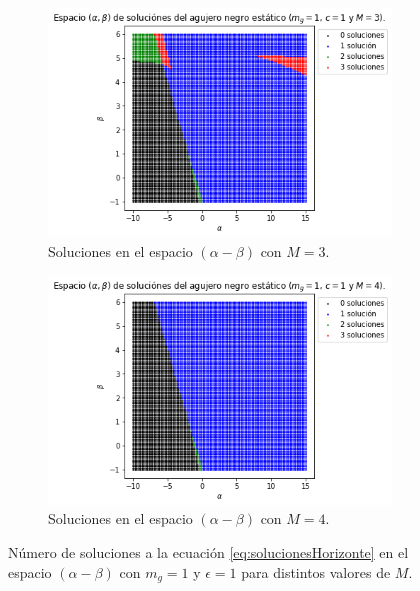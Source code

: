 \begin{figure}[H]
\begin{subfigure}[b]{0.4\textwidth}
          \includegraphics[scale=0.45]{SoluciónEstática/Horizonte de Eventos/HorizonsNum3.png}
          \caption{Soluciones en el espacio $(\alpha-\beta)$ con $M=3$.}
          \label{fig:M3}
      \end{subfigure}
    \hspace{1cm}
    \begin{subfigure}[b]{0.4\textwidth}
    \centering
        \includegraphics[scale=0.45]{SoluciónEstática/Horizonte de Eventos/HorizonsNum4.png}
        \caption{Soluciones en el espacio $(\alpha-\beta)$ con $M=4$.}
        \label{fig:M4}
    \end{subfigure}
     
     \caption{Número de soluciones a la ecuación \eqref{eq:solucionesHorizonte} en el espacio $(\alpha-\beta)$ con $m_g=1$ y $\epsilon=1$ para distintos valores de $M$. }
     \label{fig:NumHorizon}
 \end{figure}
 

